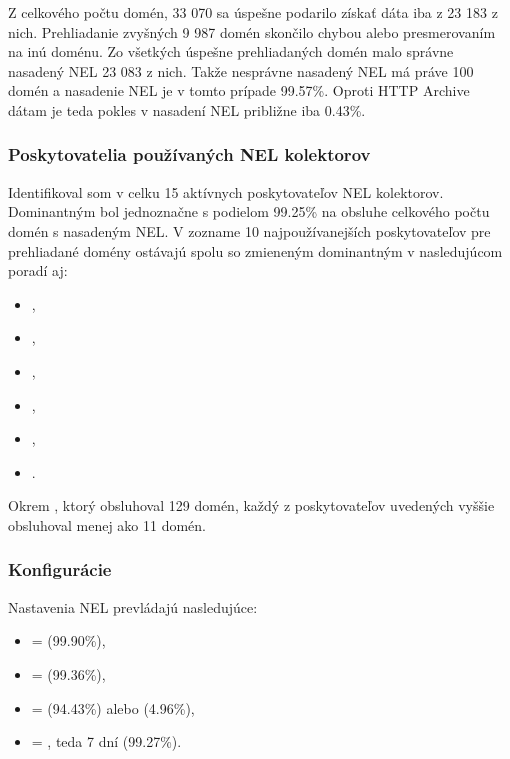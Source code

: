 Z celkového počtu domén, 33 070 sa úspešne podarilo získať dáta iba z 23 183 z nich.
Prehliadanie zvyšných 9 987 domén skončilo chybou alebo presmerovaním na inú doménu. 
Zo všetkých úspešne prehliadaných domén malo správne nasadený NEL 23 083 z nich.
Takže nesprávne nasadený NEL má práve 100 domén a nasadenie NEL je v tomto prípade 99.57\%.
Oproti HTTP Archive dátam je teda pokles v nasadení NEL približne iba 0.43\%.

\subsubsection{Poskytovatelia používaných NEL kolektorov}

Identifikoval som v celku 15 aktívnych poskytovateľov NEL kolektorov.
Dominantným bol jednoznačne  s podielom 99.25\% na obsluhe celkového počtu domén s nasadeným NEL.
V zozname 10 najpoužívanejších poskytovateľov pre prehliadané domény ostávajú spolu so zmieneným dominantným v nasledujúcom poradí aj:
\begin{itemize}
    \item {},
    \item {},
    \item {},
    \item {},
    \item {},
    \item {}.
\end{itemize}
Okrem , ktorý obsluhoval 129 domén, každý z poskytovateľov uvedených vyššie obsluhoval menej ako 11 domén.


\subsubsection{Konfigurácie}

Nastavenia NEL prevládajú nasledujúce:
\begin{itemize}
    \item {} =  (99.90\%),
    \item {} =  (99.36\%),
    \item {} =  (94.43\%) alebo  (4.96\%),
    \item {} = , teda 7 dní (99.27\%).
\end{itemize}

